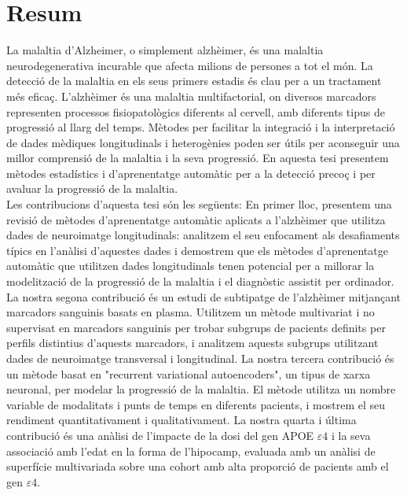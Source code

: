 \documentclass[12pt, b5paper,twoside]{tesi_upf}
\begin{document}
\vspace*{\fill}
\section*{\Large \sffamily  Resum}
La malaltia d'Alzheimer, o simplement alzhèimer, és una malaltia neurodegenerativa incurable que afecta milions de persones a tot el món. La detecció de la malaltia en els seus primers estadis és clau per a un tractament més eficaç. L’alzhèimer és una malaltia multifactorial, on diversos marcadors representen processos fisiopatològics diferents al cervell, amb diferents tipus de progressió al llarg del temps. Mètodes per facilitar la integració i la interpretació de dades mèdiques longitudinals i heterogènies poden ser útils per aconseguir una millor comprensió de la malaltia i la seva progressió. En aquesta tesi presentem mètodes estadístics i d’aprenentatge automàtic per a la detecció precoç i per avaluar la progressió de la malaltia. \\

Les contribucions d’aquesta tesi són les següents: En primer lloc, presentem una revisió de mètodes d’aprenentatge automàtic aplicats a l'alzhèimer que utilitza dades de neuroimatge longitudinals: analitzem el seu enfocament als desafiaments típics en l’anàlisi d'aquestes dades i demostrem que els mètodes d’aprenentatge automàtic que utilitzen dades longitudinals tenen potencial per a millorar la modelització de la progressió de la malaltia i el diagnòstic assistit per ordinador. La nostra segona contribució és un estudi de subtipatge de l'alzhèimer mitjançant marcadors sanguinis basats en plasma. Utilitzem un mètode multivariat i no supervisat en marcadors sanguinis per trobar subgrups de pacients definits per perfils distintius d'aquests marcadors, i analitzem aquests subgrups utilitzant dades de neuroimatge transversal i longitudinal. La nostra tercera contribució és un mètode basat en "recurrent variational autoencoders", un tipus de xarxa neuronal, per modelar la progressió de la malaltia. El mètode utilitza un nombre variable de modalitats i punts de temps en diferents pacients, i mostrem el seu rendiment quantitativament i qualitativament. La nostra quarta i última contribució és una anàlisi de l’impacte de la dosi del gen APOE $\varepsilon4$ i la seva associació amb l’edat en la forma de l’hipocamp, evaluada amb un anàlisi de superfície multivariada sobre una cohort amb alta proporció de pacients amb el gen $\varepsilon4$.
\vspace*{\fill}
\end{document}
